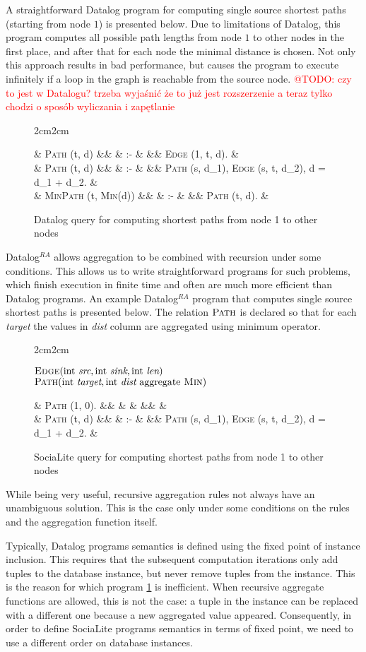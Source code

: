 \documentclass{pracamgr}
\makeatletter
\theoremstyle{plain}
\theoremstyle{definition}
\theoremstyle{remark}
\newcommand{\todo}[1]{\textcolor{red}{@TODO: #1}}
\newcommand{\datalogra}{Datalog$^{RA}$ }
\newcommand{\narrow}[1]{\begin{changemargin}{2cm}{2cm} #1 \end{changemargin}}
\newcommand{\dprog}[4]{
  \begin{figure}[h!]
    \narrow{
      #1
      \begin{flalign*}
      #2
      \end{flalign*}
      \caption{#3}
      \label{#4}
    }
\end{figure}

}
\makeatother
\begin{document}
A straightforward Datalog program for computing single source shortest paths (starting from node $1$) is presented below. Due to limitations of Datalog, this program computes all possible path lengths from node $1$ to other nodes in the first place, and after that for each node the minimal distance is chosen. Not only this approach results in bad performance, but causes the program to execute infinitely if a loop in the graph is reachable from the source node. \todo{czy to jest w Datalogu?
trzeba wyjaśnić że to już jest rozszerzenie a teraz tylko chodzi o sposób wyliczania i zapętlanie}

\dprog{}{
  & \textsc{Path} (t, d) &&  & :- & && \textsc{Edge} (1, t, d). & \\
  & \textsc{Path} (t, d) &&  & :- & && \textsc{Path} (s, d_1), \textsc{Edge} (s, t, d_2), d = d_1 + d_2. & \\
  & \textsc{MinPath} (t, \textsc{Min}(d)) &&  & :- & && \textsc{Path} (t, d). &
}{Datalog query for computing shortest paths from node 1 to other nodes}{ex:ssspdatalog}

\datalogra allows aggregation to be combined with recursion under some conditions. This allows us to write straightforward programs for such problems, which finish execution in finite time and often are much more efficient than Datalog programs. An example \datalogra program that computes single source shortest paths is presented below. The relation $\textsc{Path}$ is declared so that for each \textit{target} the values in \textit{dist} column are aggregated using minimum operator.


\dprog{
  $\textsc{Edge}(\text{int } \textit{src}, \text{int } \textit{sink}, \text{int } \textit{len}) $ \\
  $\textsc{Path}(\text{int } \textit{target}, \text{int } \textit{dist} \text{ aggregate } \textsc{Min}) $
}{
  & \textsc{Path} (1, 0). &&  & & &&  & \\
  & \textsc{Path} (t, d) &&  & :- & && \textsc{Path} (s, d_1), \textsc{Edge} (s, t, d_2), d = d_1 + d_2. &
}{SociaLite query for computing shortest paths from node 1 to other nodes}{ex:ssspsocialite}

While being very useful, recursive aggregation rules not always have an unambiguous solution. This is the case only under some conditions on the rules and the aggregation function itself.

Typically, Datalog programs semantics is defined using the fixed point of instance inclusion. This requires that the subsequent computation iterations only add tuples to the database instance, but never remove tuples from the instance. This is the reason for which program \ref{ex:ssspdatalog} is inefficient. When recursive aggregate functions are allowed, this is not the case: a tuple in the instance can be replaced with a different one because a new aggregated value appeared. Consequently, in order to define SociaLite programs semantics in terms of fixed point, we need to use a different order on database instances.
\end{document}
